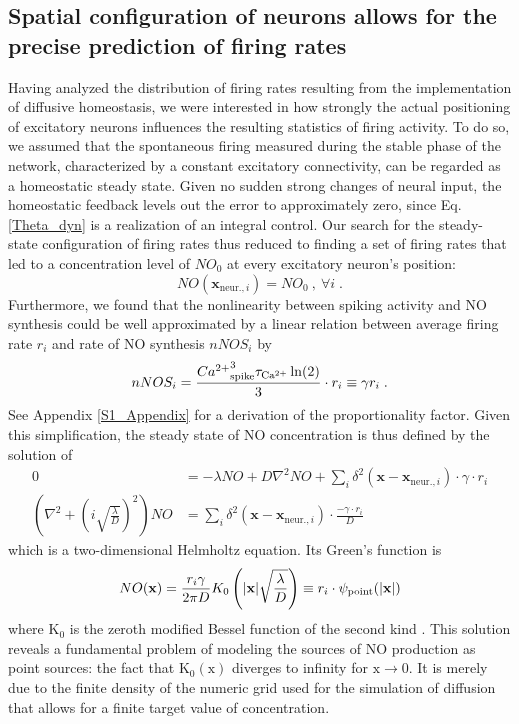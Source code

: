 \documentclass[10pt,letterpaper]{article}
\begin{document}
\subsection*{Spatial configuration of neurons allows for the precise prediction of firing rates}\label{Section_Rand_Mat_vs_Sim}
Having analyzed the distribution of firing rates resulting from the implementation of diffusive homeostasis, we were interested in how strongly the actual positioning of excitatory neurons influences the resulting statistics of firing activity. To do so, we assumed that the spontaneous firing measured during the stable phase of the network, characterized by a constant excitatory connectivity, can be regarded as a homeostatic steady state. Given no sudden strong changes of neural input, the homeostatic feedback levels out the error to approximately zero, since Eq. \ref{Theta_dyn} is a realization of an integral control. Our search for the steady-state configuration of firing rates thus reduced to finding a set of firing rates that led to a concentration level of $NO_0$ at every excitatory neuron's position:
\begin{equation}
NO(\mathbf{x}_{\mathrm{neur.},i}) = NO_0 \:, \: \forall i \; .
\label{NO_equil_cond}
\end{equation}
Furthermore, we found that the nonlinearity between spiking activity and NO synthesis could be well approximated by a linear relation between average firing rate $r_i$ and rate of NO synthesis $nNOS_i$ by
\begin{equation}
nNOS_i = \frac{{Ca^{2+}}^3_{\rm spike} \tau_{\rm Ca^{2+}}\ln(2)}{3} \cdot r_i \equiv \gamma r_i \; .
\label{simpl_nNOS}
\end{equation}
See Appendix \ref{S1_Appendix} for a derivation of the proportionality factor. Given this simplification, the steady state of NO concentration is thus defined by the solution of
\begin{align}
0 &=-\lambda NO + D \nabla^2 NO + \sum_{i} \delta^2(\mathbf{x}-\mathbf{x}_{\mathrm{neur.},i})\cdot \gamma \cdot r_i \label{simple_NO_dyn_with_diff} \\
\left(\nabla^2 + \left( i\sqrt{\frac{\lambda}{D}}\right)^2\right) NO &= \sum_{i} \delta^2(\mathbf{x}-\mathbf{x}_{\mathrm{neur.},i})\cdot \frac{- \gamma \cdot r_i}{D}
\label{simple_NO_dyn_with_diff_equil_helmholtz}
\end{align}
which is a two-dimensional Helmholtz equation. Its Green's function is
\begin{equation}
NO(\mathbf{x}) = \frac{r_i \gamma}{2 \pi D} K_0 \left(|\mathbf{x}|\sqrt{\frac{\lambda}{D}} \right) \equiv r_i \cdot \psi_{\rm point}(|\mathbf{x}|)
\label{solution_diff_equil_bessel}
\end{equation}
where $\mathrm{K_0}$ is the zeroth modified Bessel function of the second kind \cite{Helmholtz_Solution_2d}.  This solution reveals a fundamental problem of modeling the sources of NO production as point sources: the fact that $\mathrm{K_0(x)}$ diverges to infinity for $\mathrm{x\rightarrow 0}$. It is merely due to the finite density of the numeric grid used for the simulation of diffusion that allows for a finite target value of concentration.
\end{document}
